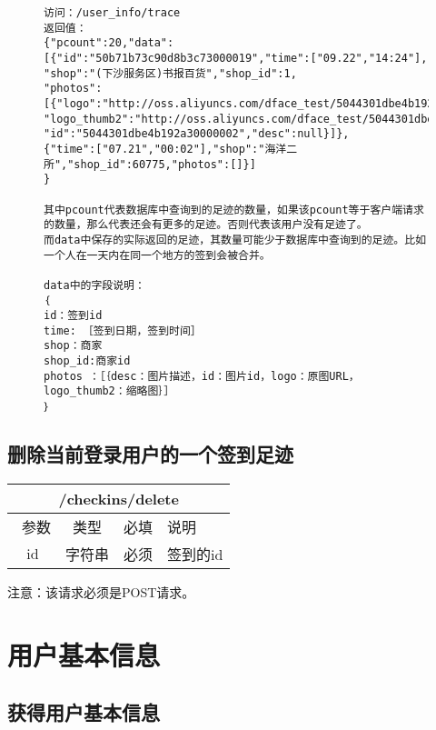 \documentclass[cs4size]{ctexartutf8}
\begin{document}
\begin{figure}[H]
\begin{verbatim}
访问：/user_info/trace
返回值：
{"pcount":20,"data":
[{"id":"50b71b73c90d8b3c73000019","time":["09.22","14:24"],
"shop":"(下沙服务区)书报百货","shop_id":1,
"photos":[{"logo":"http://oss.aliyuncs.com/dface_test/5044301dbe4b192a30000002/0.jpg",
"logo_thumb2":"http://oss.aliyuncs.com/dface_test/5044301dbe4b192a30000002/t2_0.jpg",
"id":"5044301dbe4b192a30000002","desc":null}]},
{"time":["07.21","00:02"],"shop":"海洋二所","shop_id":60775,"photos":[]}]
}

其中pcount代表数据库中查询到的足迹的数量，如果该pcount等于客户端请求的数量，那么代表还会有更多的足迹。否则代表该用户没有足迹了。
而data中保存的实际返回的足迹，其数量可能少于数据库中查询到的足迹。比如一个人在一天内在同一个地方的签到会被合并。

data中的字段说明：
｛
id：签到id
time: ［签到日期，签到时间］
shop：商家
shop_id:商家id
photos ：［｛desc：图片描述，id：图片id，logo：原图URL，logo_thumb2：缩略图｝］
｝

\end{verbatim}
\end{figure}



\subsection{删除当前登录用户的一个签到足迹}

\begin{table}[H]
   \begin{center}
\begin{tabular}{|c|c|c|p{12cm}|}
\hline
\multicolumn{4}{|c|}{/checkins/delete} \\
\hline\hline
 \  参数  & 类型 & 必填 &  说明  \\
   \hline
 id  & 字符串 & 必须 & 签到的id\\ 
 \hline
\end{tabular}
   \end{center}
\end{table}

注意：该请求必须是POST请求。





\section{用户基本信息}

\subsection{获得用户基本信息}
\end{document}

